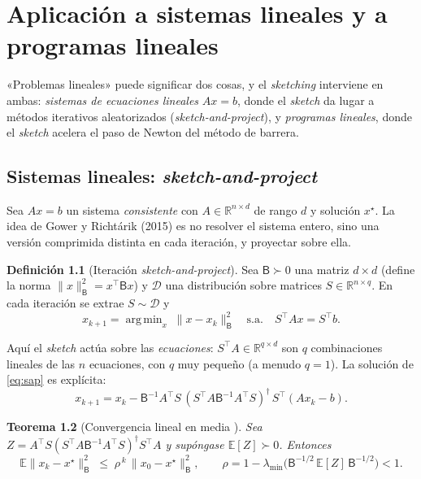 \documentclass[11pt,a4paper,oneside]{book}
\newtheorem{teorema}{Teorema}[chapter]
\theoremstyle{definition}
\newtheorem{definicion}[teorema]{Definición}
\theoremstyle{remark}
\newcommand{\R}{\mathbb{R}}
\newcommand{\E}{\mathbb{E}}
\newcommand{\T}{^{\top}}
\newcommand{\nrm}[1]{\lVert #1\rVert}
\DeclareMathOperator*{\argmin}{arg\,min}
\begin{document}
\chapter{Aplicación a sistemas lineales y a programas lineales}\label{cap:lin}

«Problemas lineales» puede significar dos cosas, y el \emph{sketching} interviene en ambas: \emph{sistemas de
ecuaciones lineales} $Ax=b$, donde el \emph{sketch} da lugar a métodos iterativos aleatorizados
(\emph{sketch-and-project}), y \emph{programas lineales}, donde el \emph{sketch} acelera el paso de Newton del
método de barrera.

\section{Sistemas lineales: \emph{sketch-and-project}}

Sea $Ax=b$ un sistema \emph{consistente} con $A\in\R^{n\times d}$ de rango $d$ y solución $x^\star$. La idea de
Gower y Richtárik (2015) es no resolver el sistema entero, sino una versión comprimida distinta en cada
iteración, y proyectar sobre ella.

\begin{definicion}[Iteración \emph{sketch-and-project}]\label{def:sap}
Sea $\mathsf B\succ0$ una matriz $d\times d$ (define la norma $\nrm{x}_{\mathsf B}^2=x\T\mathsf Bx$) y $\mathcal D$ una
distribución sobre matrices $S\in\R^{n\times q}$. En cada iteración se extrae $S\sim\mathcal D$ y
\begin{equation}\label{eq:sap}
  x_{k+1}=\argmin_{x}\;\nrm{x-x_k}_{\mathsf B}^2\quad\text{s.a.}\quad S\T Ax=S\T b .
\end{equation}
\end{definicion}

Aquí el \emph{sketch} actúa sobre las \emph{ecuaciones}: $S\T A\in\R^{q\times d}$ son $q$ combinaciones lineales de
las $n$ ecuaciones, con $q$ muy pequeño (a menudo $q=1$). La solución de \eqref{eq:sap} es explícita:
\begin{equation}\label{eq:sap-explicita}
  x_{k+1}=x_k-\mathsf B^{-1}A\T S\,(S\T A\mathsf B^{-1}A\T S)^{\dagger}\,S\T(Ax_k-b).
\end{equation}

\begin{teorema}[Convergencia lineal en media {\cite{GR15}}]\label{teo:sap}
Sea $Z=A\T S(S\T A\mathsf B^{-1}A\T S)^{\dagger}S\T A$ y supóngase $\E[Z]\succ0$. Entonces
\[ \E\nrm{x_k-x^\star}_{\mathsf B}^2\;\le\;\rho^{\,k}\,\nrm{x_0-x^\star}_{\mathsf B}^2,\qquad
   \rho=1-\lambda_{\min}\bigl(\mathsf B^{-1/2}\,\E[Z]\,\mathsf B^{-1/2}\bigr)<1 . \]
\end{teorema}
\end{document}
